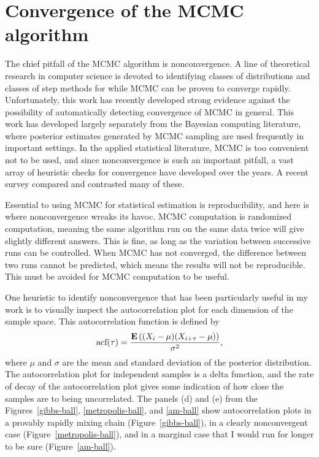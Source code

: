 \section{Convergence of the MCMC algorithm}

The chief pitfall of the MCMC algorithm is nonconvergence.  A line of
theoretical research in computer science is devoted to identifying
classes of distributions and classes of step methods for while MCMC
can be proven to converge
rapidly.\cite{dyer_random_1990,bubley_path_1997,
  dyer_markov_2000,geyer_introduction_2010} Unfortunately, this work
has recently developed strong evidence against the possibility of
automatically detecting convergence of MCMC in
general.\cite{batnagar_computational_2011} This work has developed
largely separately from the Bayesian computing literature, where
posterior estimates generated by MCMC sampling are used frequently in
important
settings.\cite{gilks_markov_1996,jon_wakefield_bayesian_1996,gelman_bayesian_2003}
In the applied statistical literature, MCMC is too convenient not to
be used, and since nonconvergence is such an important pitfall, a vast
array of heuristic checks for convergence have developed over the
years. A recent survey compared and contrasted many of
these.\cite{mengersen_mcmc_1999}

Essential to using MCMC for statistical estimation is reproducibility,
and here is where nonconvergence wreaks its havoc.  MCMC computation
is randomized computation, meaning the same algorithm run on the same
data twice will give slightly different answers.  This is fine, as
long as the variation between successive runs can be controlled.  When
MCMC has not converged, the difference between two runs cannot be
predicted, which means the results will not be reproducible.  This
must be avoided for MCMC computation to be useful.

One heuristic to identify nonconvergence that has been particularly
useful in my work is to visually inspect the autocorrelation plot for
each dimension of the sample space.  This autocorrelation function is defined by
\[
\text{acf}(\tau) = \frac{\mathbf{E}\left((X_i - \mu)(X_{i+\tau} - \mu)\right)}{\sigma^2},
\]
where $\mu$ and $\sigma$ are the mean and standard deviation of the
posterior distribution.  The autocorrelation plot for independent
samples is a delta function, and the rate of decay of the
autocorrelation plot gives some indication of how close the samples
are to being uncorrelated.  The panels (d) and (e) from the
Figures~\ref{gibbs-ball}, \ref{metropolis-ball}, and \ref{am-ball}
show autocorrelation plots in a provably rapidly mixing chain
(Figure~\ref{gibbs-ball}), in a clearly nonconvergent case
(Figure~\ref{metropolis-ball}), and in a marginal case that I would
run for longer to be sure (Figure~\ref{am-ball}).

